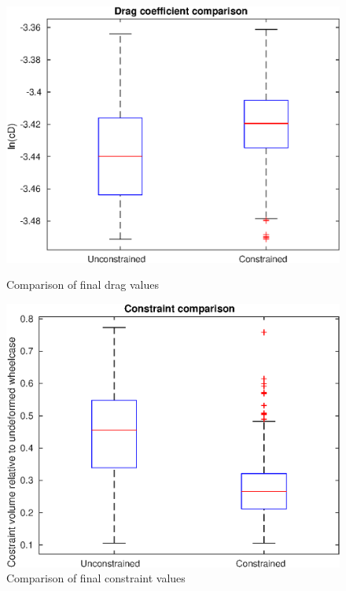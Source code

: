 \begin{figure}[h]
	\centering
	\begin{minipage}{0.45\textwidth}
		\centering
		\includegraphics[width=1\linewidth]{bilder/2pt500Samples/dragBoxplot}
		\caption{Comparison of final drag values}
		\label{fig:1stdragbox}
	\end{minipage}\hfill
	\begin{minipage}{0.45\textwidth}
		\centering
		\includegraphics[width=1\linewidth]{bilder/2pt500Samples/constraintBoxplot}
		\caption{Comparison of final constraint values}
		\label{fig:1stconbox}
	\end{minipage}
\end{figure}

